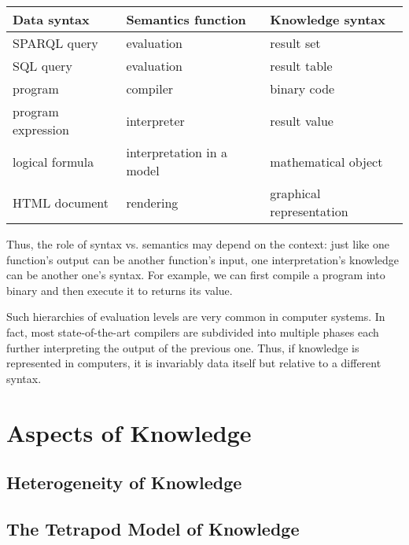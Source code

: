 \begin{center}
\begin{tabular}{l|l|l}
Data syntax & Semantics function & Knowledge syntax \\
\hline
SPARQL query & evaluation & result set \\
SQL query & evaluation & result table \\
program & compiler & binary code \\
program expression & interpreter & result value \\ 
logical formula & interpretation in a model & mathematical object \\
HTML document & rendering & graphical representation 
\end{tabular}
\end{center}

Thus, the role of syntax vs. semantics may depend on the context: just like one function's output can be another function's input, one interpretation's knowledge can be another one's syntax.
For example, we can first compile a program into binary and then execute it to returns its value.

Such hierarchies of evaluation levels are very common in computer systems.
In fact, most state-of-the-art compilers are subdivided into multiple phases each further interpreting the output of the previous one.
Thus, if knowledge is represented in computers, it is invariably data itself but relative to a different syntax.

\section{Aspects of Knowledge}

\subsection{Heterogeneity of Knowledge}

\subsection{The Tetrapod Model of Knowledge}

